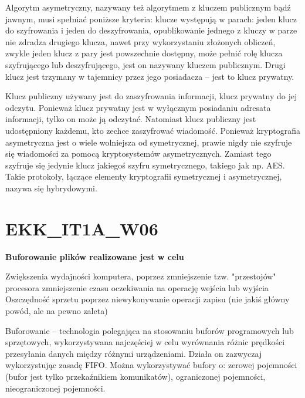 Algorytm asymetryczny, nazywany też algorytmem z kluczem publicznym bądź jawnym, musi spełniać poniższe kryteria:    
klucze występują w parach: jeden klucz do szyfrowania i jeden do deszyfrowania,
opublikowanie jednego z kluczy w parze nie zdradza drugiego klucza, nawet przy wykorzystaniu złożonych obliczeń,
zwykle jeden klucz z pary jest powszechnie dostępny, może pełnić rolę klucza szyfrującego lub deszyfrującego, jest on nazywany kluczem publicznym. Drugi klucz jest trzymany w tajemnicy przez jego posiadacza – jest to klucz prywatny.

Klucz publiczny używany jest do zaszyfrowania informacji, klucz prywatny do jej odczytu. Ponieważ klucz prywatny jest w wyłącznym posiadaniu adresata informacji, tylko on może ją odczytać. Natomiast klucz publiczny jest udostępniony każdemu, kto zechce zaszyfrować wiadomość.
Ponieważ kryptografia asymetryczna jest o wiele wolniejsza od symetrycznej, prawie nigdy nie szyfruje się wiadomości za pomocą kryptosystemów asymetrycznych. Zamiast tego szyfruje się jedynie klucz jakiegoś szyfru symetrycznego, takiego jak np. AES. Takie protokoły, łączące elementy kryptografii symetrycznej i asymetrycznej, nazywa się hybrydowymi.




\section{EKK\_IT1A\_W06}
\textbf{Buforowanie plików realizowane jest w celu}

\vspace{0.4cm}

Zwiększenia wydajności komputera, poprzez zmniejszenie tzw. "przestojów" procesora
zmniejszenie czasu oczekiwania na operację wejścia lub wyjścia
Oszczędność sprzetu poprzez niewykonywanie operacji zapisu (nie jakiś główny powód, ale na pewno zaleta)

Buforowanie – technologia polegająca na stosowaniu buforów programowych lub sprzętowych, wykorzystywana najczęściej w celu wyrównania różnic prędkości przesyłania danych między różnymi urządzeniami. Działa on zazwyczaj wykorzystując zasadę FIFO.
Można wykorzystywać bufory o:
zerowej pojemności (bufor jest tylko przekaźnikiem komunikatów),
ograniczonej pojemności,
nieograniczonej pojemności.
